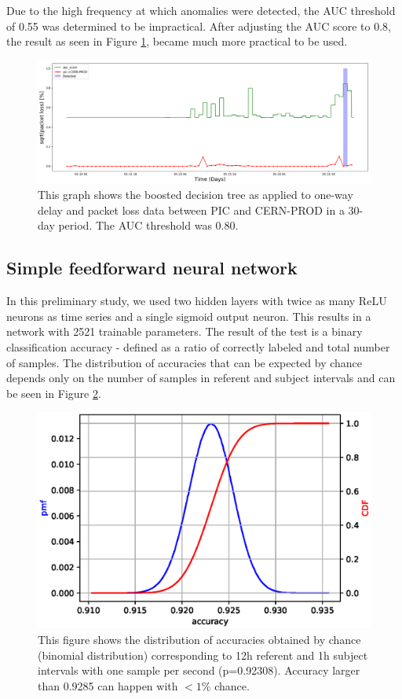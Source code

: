 \documentclass[5p]{elsarticle}
\begin{document}
Due to the high frequency at which anomalies were detected, the AUC threshold of 0.55 was determined to be impractical. After adjusting the AUC score to 0.8, the result as seen in Figure \ref{fig:BDThigh}, became much more practical to be used. 
\begin{figure}[htbp]
    \centering
    \includegraphics[width=\linewidth]{BDT_highcut.png}
    \caption{This graph shows the boosted decision tree as applied to one-way delay and packet loss data between PIC and CERN-PROD in a 30-day period. The AUC threshold was 0.80.}
    \label{fig:BDThigh}
\end{figure}


\subsection{Simple feedforward neural network}

In this preliminary study, we used two hidden layers with twice as many ReLU neurons as time series and a single sigmoid output neuron. This results in a network with 2521 trainable parameters.
The result of the test is a binary classification accuracy - defined as a ratio of correctly labeled and total number of samples. The distribution of accuracies that can be expected by chance depends only on the number of samples in referent and subject intervals and can be seen in Figure \ref{fig:Chance}.


\begin{figure}[htbp]
    \centering
    \includegraphics[width=\linewidth]{binomial_chance_accuracy.eps}
    \caption{This figure shows the distribution of accuracies obtained by chance (binomial distribution) corresponding to 12h referent and 1h subject intervals with one sample per second (p=0.92308). Accuracy larger than 0.9285 can happen with $<1\%$ chance. }
    \label{fig:Chance}
\end{figure}
\end{document}
